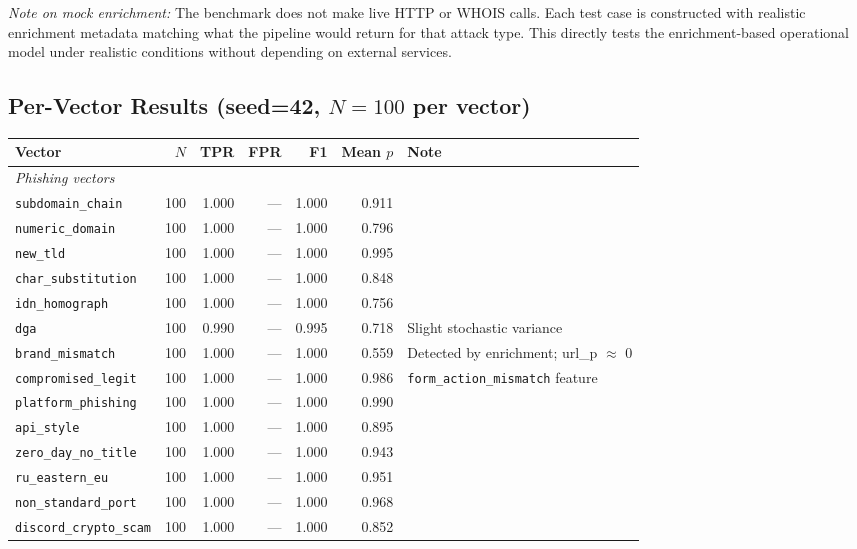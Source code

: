 \documentclass[11pt,a4paper]{article}
\newcommand{\code}[1]{\texttt{#1}}
\begin{document}
\textit{Note on mock enrichment:} The benchmark does not make live
HTTP or WHOIS calls. Each test case is constructed with realistic
enrichment metadata matching what the pipeline would return for that
attack type. This directly tests the enrichment-based operational
model under realistic conditions without depending on external
services.

\subsection{Per-Vector Results (seed=42, $N=100$ per vector)}

\begin{table}[h]
\centering
\small
\begin{tabular}{lrrrrrp{4.5cm}}
\toprule
Vector & $N$ & TPR & FPR & F1 & Mean $p$ & Note \\
\midrule
\multicolumn{7}{l}{\textit{Phishing vectors}} \\
\code{subdomain\_chain}     & 100 & 1.000 & --- & 1.000 & 0.911 & \\
\code{numeric\_domain}      & 100 & 1.000 & --- & 1.000 & 0.796 & \\
\code{new\_tld}             & 100 & 1.000 & --- & 1.000 & 0.995 & \\
\code{char\_substitution}   & 100 & 1.000 & --- & 1.000 & 0.848 & \\
\code{idn\_homograph}       & 100 & 1.000 & --- & 1.000 & 0.756 & \\
\code{dga}                  & 100 & 0.990 & --- & 0.995 & 0.718 &
  Slight stochastic variance \\
\code{brand\_mismatch}      & 100 & 1.000 & --- & 1.000 & 0.559 &
  Detected by enrichment; url\_p $\approx$ 0 \\
\code{compromised\_legit}   & 100 & 1.000 & --- & 1.000 & 0.986 &
  \code{form\_action\_mismatch} feature \\
\code{platform\_phishing}   & 100 & 1.000 & --- & 1.000 & 0.990 & \\
\code{api\_style}           & 100 & 1.000 & --- & 1.000 & 0.895 & \\
\code{zero\_day\_no\_title} & 100 & 1.000 & --- & 1.000 & 0.943 & \\
\code{ru\_eastern\_eu}      & 100 & 1.000 & --- & 1.000 & 0.951 & \\
\code{non\_standard\_port}  & 100 & 1.000 & --- & 1.000 & 0.968 & \\
\code{discord\_crypto\_scam} & 100 & 1.000 & --- & 1.000 & 0.852 & \\

\end{tabular}
\end{table}
\end{document}
